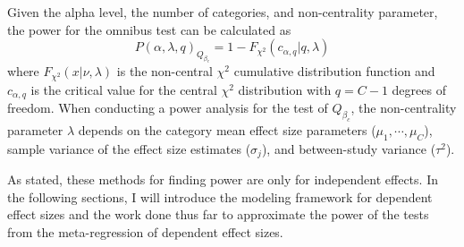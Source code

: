 

Given the alpha level, the number of categories, and non-centrality parameter,  the power for the omnibus test can be calculated as
\begin{equation}
    P(\alpha, \lambda, q)_{Q_{\beta_c}} = 1 - F_{\chi^2} (c_{\alpha, q} | q , \lambda)
\end{equation}
where $F_{\chi^2}(x|\nu, \lambda)$ is the non-central $\chi^2$  cumulative distribution function and $c_{\alpha,q}$ is the critical value for the central $\chi^2$ distribution with $q = C - 1$ degrees of freedom. When conducting a power analysis for the test of $Q_{\beta_c}$, the non-centrality parameter $\lambda$ depends on the category mean effect size parameters ($\mu_1, \cdots, \mu_C$), sample variance of the effect size estimates ($\sigma_j$), and between-study variance ($\tau^2$). 





As stated, these methods for finding power are only for independent effects. In the following sections, I will introduce the modeling framework for dependent effect sizes and the work done thus far to approximate the power of the tests from the meta-regression of dependent effect sizes. 



